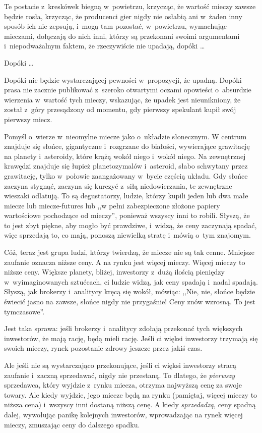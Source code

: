 \documentclass[oneside,polish,11pt,rmheadings]{mwbk}
\begin{document}
Te postacie z~kreskówek biegną w~powietrzu, krzycząc, że wartość mieczy zawsze będzie rosła, krzycząc, że producenci gier nigdy nie osłabią ani w~żaden inny sposób ich nie zepsują, i~mogą tam pozostać, w~powietrzu, wymachując mieczami, dołączają do nich inni, którzy są przekonani swoimi argumentami i~niepodważalnym faktem, że rzeczywiście nie upadają, dopóki \ldots 

Dopóki \ldots 

Dopóki nie będzie wystarczającej pewności w~propozycji, że upadną. Dopóki prasa nie zacznie publikować z~szeroko otwartymi oczami opowieści o~absurdzie wierzenia w~wartość tych mieczy, wskazując, że upadek jest nieunikniony, że został z~góry przesądzony od momentu, gdy pierwszy spekulant kupił swój pierwszy miecz.

Pomyśl o~wierze w~nieomylne miecze jako o~układzie słonecznym. W centrum znajduje się słońce, gigantyczne i~rozgrzane do białości, wywierające grawitację na planety i~asteroidy, które krążą wokół niego i~wokół niego. Na zewnętrznej krawędzi znajduje się łupież planetozymalów i~asteroid, słabo schwytany przez grawitację, tylko w~połowie zaangażowany w~bycie częścią układu. Gdy słońce zaczyna stygnąć, zaczyna się kurczyć z~siłą niedowierzania, te zewnętrzne wieszaki odlatują. To są degustatorzy, ludzie, którzy kupili jeden lub dwa małe miecze lub miecze-futures lub ,,w pełni zabezpieczone złożone papiery wartościowe pochodzące od mieczy'', ponieważ wszyscy inni to robili. Słyszą, że to jest zbyt piękne, aby mogło być prawdziwe, i~widzą, że ceny zaczynają spadać, więc sprzedają to, co mają, ponoszą niewielką stratę i~mówią o~tym znajomym.

Cóż, teraz jest grupa ludzi, którzy twierdzą, że miecze nie są tak cenne. Mniejsze zaufanie oznacza niższe ceny. A na rynku jest więcej mieczy. Więcej mieczy to niższe ceny. Większe planety, bliżej, inwestorzy z~dużą ilością pieniędzy w~wyimaginowanych sztućcach, ci ludzie widzą, jak ceny spadają i~nadal spadają. Słyszą, jak brokerzy i~analitycy kręcą się wokół, mówiąc: ,,Nie, nie, słońce będzie świecić jasno na zawsze, słońce nigdy nie przygaśnie! Ceny znów wzrosną. To jest tymczasowe''.

Jest taka sprawa: jeśli brokerzy i~analitycy zdołają przekonać tych większych inwestorów, że mają rację, będą mieli rację. Jeśli ci więksi inwestorzy trzymają się swoich mieczy, rynek pozostanie zdrowy jeszcze przez jakiś czas.

Ale jeśli nie są wystarczająco przekonujące, jeśli ci więksi inwestorzy stracą zaufanie i~zaczną sprzedawać, nigdy nie przestaną. To dlatego, że \textit{pierwszy }sprzedawca, który wyjdzie z~rynku miecza, otrzyma najwyższą cenę za swoje towary. Ale kiedy wyjdzie, jego miecze będą na rynku (pamiętaj, więcej mieczy to niższa cena) i~wszyscy inni dostaną niższą cenę. A kiedy \textit{sprzedadzą}, ceny spadną dalej, wywołując panikę kolejnych inwestorów, wprowadzając na rynek więcej mieczy, zmuszając ceny do dalszego spadku.
\end{document}
